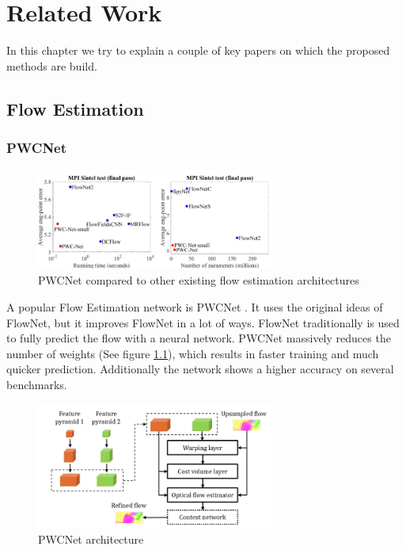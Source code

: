 \chapter{Related Work}
In this chapter we try to explain a couple of key papers on which the proposed methods are build.

\section{Flow Estimation}

\subsection{PWCNet}

\begin{figure}[h]
\centering
\includegraphics[width=0.7\textwidth]{images/pwcnet_improvements}
\caption{PWCNet compared to other existing flow estimation architectures}
\label{fig:pwc_compare}
\end{figure}

A popular Flow Estimation network is PWCNet \cite{sun_pwc-net_2018}. It uses the original ideas of FlowNet, but it improves FlowNet in a lot of ways. FlowNet traditionally is used to fully predict the flow with a neural network. PWCNet massively reduces the number of weights (See figure \ref{fig:pwc_compare}), which results in faster training and much quicker prediction. Additionally the network shows a higher accuracy on several benchmarks.

\begin{figure}[h]
\centering
\includegraphics[width=0.7\textwidth]{images/pwcnet_approach}
\caption{PWCNet architecture}
\label{fig:pwc_approach}
\end{figure}

